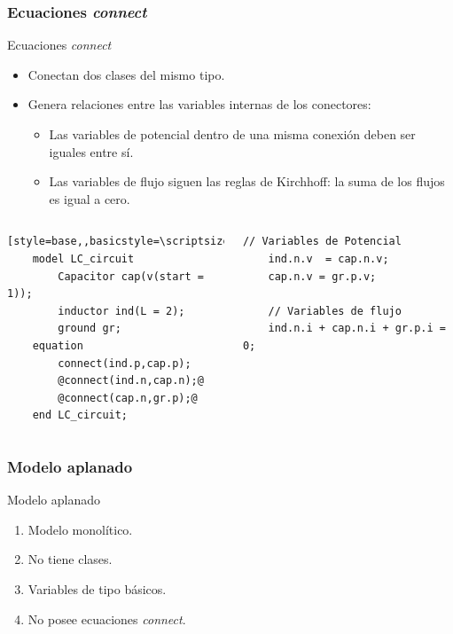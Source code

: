 \begin{frame}[fragile]
\frametitle{Ecuaciones \textit{connect}} 
\begin{block}{Ecuaciones \textit{connect}}
    \begin{itemize}
        \item Conectan dos clases del mismo tipo.
        \item Genera relaciones entre las variables internas de los conectores:
            \begin{itemize}
                \item Las variables de potencial dentro de una misma conexión deben ser iguales entre sí.
                \item Las variables de flujo siguen las reglas de Kirchhoff: la suma de los flujos es igual a cero. 
        \end{itemize}
    \end{itemize}
\end{block}{}
\pause
\begin{columns}  
\column[T]{8cm}
 \begin{lstlisting}[style=base,,basicstyle=\scriptsize]
    model LC_circuit
        Capacitor cap(v(start = 1));
        inductor ind(L = 2);
        ground gr;
    equation
        connect(ind.p,cap.p);
        @connect(ind.n,cap.n);@
        @connect(cap.n,gr.p);@
    end LC_circuit;
\end{lstlisting}
\column[T]{6cm}
 \begin{lstlisting}[style=base]
    // Variables de Potencial 
    ind.n.v  = cap.n.v;
    cap.n.v = gr.p.v;
    
    // Variables de flujo 
    ind.n.i + cap.n.i + gr.p.i = 0;
\end{lstlisting}
\end{columns}
\end{frame}

\begin{frame}[fragile]
\frametitle{Modelo aplanado} 
\begin{block}{Modelo aplanado}
\begin{enumerate}
\item Modelo monolítico.
\item No tiene clases.
\item Variables de tipo básicos.
\item No posee ecuaciones \textit{connect}.
\end{enumerate}
\end{block}
\end{frame}

